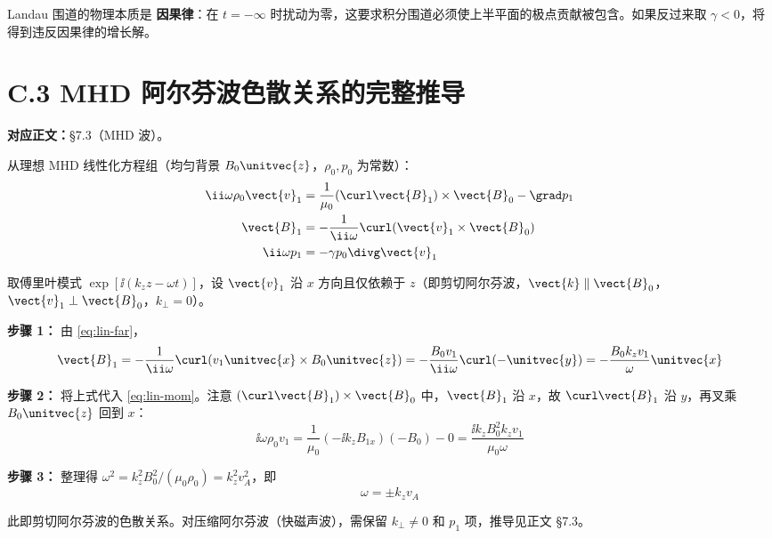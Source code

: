 \begin{insight}{}{}
Landau 围道的物理本质是 \textbf{因果律}：在 $t=-\infty$ 时扰动为零，这要求积分围道必须使上半平面的极点贡献被包含。如果反过来取 $\gamma<0$，将得到违反因果律的增长解。
\end{insight}


\section{C.3 MHD 阿尔芬波色散关系的完整推导}
\label{sec:alfven-dispersion}

\textbf{对应正文：}\S 7.3（MHD 波）。

从理想 MHD 线性化方程组（均匀背景 $B_0\unitvec{z}$，$\rho_0, p_0$ 为常数）：
\begin{align}
\ii\omega\rho_0\vect{v}_1 &= \frac{1}{\mu_0}(\curl\vect{B}_1)\times\vect{B}_0 - \grad p_1 \label{eq:lin-mom}\\
\vect{B}_1 &= -\frac{1}{\ii\omega}\curl(\vect{v}_1\times\vect{B}_0) \label{eq:lin-far}\\
\ii\omega p_1 &= -\gamma p_0\divg\vect{v}_1 \label{eq:lin-eos}
\end{align}

取傅里叶模式 $\exp[\ii(k_z z - \omega t)]$，设 $\vect{v}_1$ 沿 $x$ 方向且仅依赖于 $z$（即剪切阿尔芬波，$\vect{k}\parallel\vect{B}_0$，$\vect{v}_1\perp\vect{B}_0$，$k_\perp=0$）。

\textbf{步骤 1：} 由 \eqref{eq:lin-far}，
\begin{equation}
\vect{B}_1 = -\frac{1}{\ii\omega}\curl(v_1\unitvec{x}\times B_0\unitvec{z}) = -\frac{B_0 v_1}{\ii\omega}\curl(-\unitvec{y}) = -\frac{B_0 k_z v_1}{\omega}\unitvec{x}
\end{equation}

\textbf{步骤 2：} 将上式代入 \eqref{eq:lin-mom}。注意 $(\curl\vect{B}_1)\times\vect{B}_0$ 中，$\vect{B}_1$ 沿 $x$，故 $\curl\vect{B}_1$ 沿 $y$，再叉乘 $B_0\unitvec{z}$ 回到 $x$：
\begin{equation}
\ii\omega\rho_0 v_1 = \frac{1}{\mu_0}(-\ii k_z B_{1x})(-B_0) - 0 = \frac{\ii k_z B_0^2 k_z v_1}{\mu_0\omega}
\end{equation}

\textbf{步骤 3：} 整理得 $\omega^2 = k_z^2 B_0^2/(\mu_0\rho_0) = k_z^2 v_A^2$，即
\begin{equation}
\boxed{\omega = \pm k_z v_A}
\end{equation}

此即剪切阿尔芬波的色散关系。对压缩阿尔芬波（快磁声波），需保留 $k_\perp\neq 0$ 和 $p_1$ 项，推导见正文 \S 7.3。


